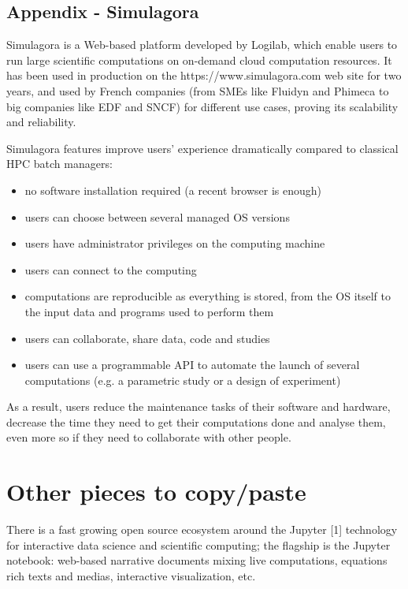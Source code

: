 \subsection{Appendix - Simulagora}

Simulagora is a Web-based platform developed by Logilab, which enable
users to run large scientific computations on on-demand cloud
computation resources. It has been used in production on the
https://www.simulagora.com web site for two years, and used by French
companies (from SMEs like Fluidyn and Phimeca to big companies like
EDF and SNCF) for different use cases, proving its scalability
and reliability.

Simulagora features improve users' experience dramatically compared to
classical HPC batch managers:

\begin {itemize}
\item no software installation required (a recent browser is enough)
\item users can choose between several managed OS versions
\item users have administrator privileges on the computing machine
\item users can connect to the computing
\item computations are reproducible as everything is stored, from the
  OS itself to the input data and programs used to perform them
\item users can collaborate, share data, code and studies
\item users can use a programmable API to automate the launch of
  several computations (e.g. a parametric study or a design of
  experiment)
\end {itemize}

As a result, users reduce the maintenance tasks of their software and
hardware, decrease the time they need to get their computations done
and analyse them, even more so if they need to collaborate with other
people.

\section*{Other pieces to copy/paste}

There is a fast growing open source ecosystem around the Jupyter [1]
technology for interactive data science and scientific computing; the
flagship is the Jupyter notebook: web-based narrative documents mixing
live computations, equations rich texts and medias, interactive
visualization, etc.


